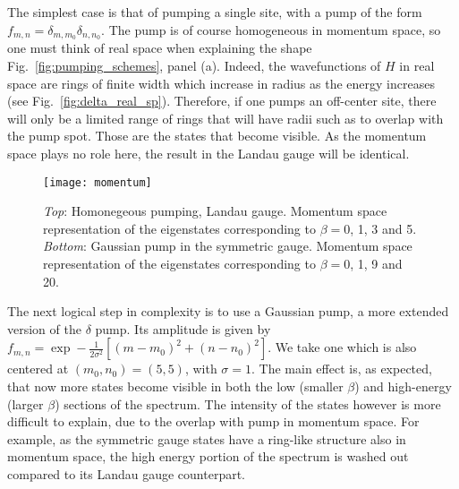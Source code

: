 \documentclass[twocolumn, 10pt, aps, superscriptaddress, floatfix, showpacs, pra, citeautoscript]{revtex4-1}
\newcommand{\co}[2]{#2}
\renewcommand{\paragraph}{\co}
\begin{document}
\paragraph{A δ pump in real space is homogeneous in momentum space.}
The simplest case is that of pumping a single site, with a pump of the
form $f_{m,n} = \delta_{m,m_0} \delta_{n,n_0}$. The pump is of course
homogeneous in momentum space, so one must think of real space when
explaining the shape Fig.~\ref{fig:pumping_schemes}, panel (a).
Indeed, the wavefunctions of $H$ in real space are rings of finite
width which increase in radius as the energy increases (see
Fig.~\ref{fig:delta_real_sp}). Therefore, if one pumps an off-center
site, there will only be a limited range of rings that will have radii
such as to overlap with the pump spot. Those are the states that
become visible. As the momentum space plays no role here, the result
in the Landau gauge will be identical.
%
\begin{figure}[htb]\centering
  \texttt{[image: momentum]}
  \caption{\emph{Top}: Homonegeous pumping, Landau gauge. Momentum
    space representation of the eigenstates corresponding to
    $\beta=0$, 1, 3 and 5.  
    \emph{Bottom}: Gaussian pump in the
    symmetric gauge. Momentum space representation of the eigenstates
    corresponding to $\beta=0$, 1, 9 and 20.}
  \label{fig:hom_mom_sp}
\end{figure}


\paragraph{Gaussian pumping is now bound also in momentum space.}
The next logical step in complexity is to use a Gaussian pump, a more
extended version of the $\delta$ pump. Its amplitude is given by
$f_{m,n} = \exp- \frac{1}{2\sigma^2} \left[(m-m_0)^2 + (n-n_0)^2
\right]$.
We take one which is also centered at $(m_0,n_0) = (5,5)$, with
$\sigma =1$. The main effect is, as expected, that now more states
become visible in both the low (smaller $\beta$) and high-energy
(larger $\beta$) sections of the spectrum. The intensity of the states
however is more difficult to explain, due to the overlap with pump in
momentum space. For example, as the symmetric gauge states have a
ring-like structure also in momentum space, the high energy portion of
the spectrum is washed out compared to its Landau gauge counterpart.
\end{document}
